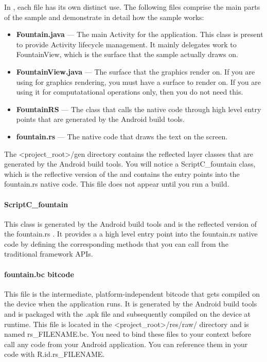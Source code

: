 In \Fountain{}, each file has its own distinct use. The following files comprise the main parts of the sample and demonstrate in detail how the sample works:
\begin{itemize}
\item \textbf{Fountain.java} ---  The main Activity for the application. This class is present to provide Activity lifecycle management. It mainly delegates work to FountainView, which is the \RS{} surface that the sample actually draws on.
\item \textbf{FountainView.java} --- The \RS{} surface that the graphics render on. If you are using \RS{} for graphics rendering, you must have a surface to render on. If you are using it for computatational operations only, then you do not need this.
\item \textbf{FountainRS} --- The class that calls the native \RS{} code through high level entry points that are generated by the Android build tools.
\item \textbf{fountain.rs} --- The \RS{} native code that draws the text on the screen.
\end{itemize}

The <project\_root>/gen directory contains the reflected layer classes that are generated by the Android build tools. You will notice a ScriptC\_fountain class, which is the reflective version of the \RS{} and contains the entry points into the fountain.rs native code. This file does not appear until you run a build.

\paragraph{ScriptC\_fountain}
This class is generated by the Android build tools and is the reflected version of the fountain.rs \RS{}. It provides a a high level entry point into the fountain.rs native code by defining the corresponding methods that you can call from the traditional framework APIs.

\paragraph{fountain.bc bitcode}
This file is the intermediate, platform-independent bitcode that gets compiled on the device when the \RS{} application runs. It is generated by the Android build tools and is packaged with the .apk file and subsequently compiled on the device at runtime. This file is located in the <project\_root>/res/raw/ directory and is named rs\_FILENAME.bc. You need to bind these files to your \RS{} context before call any \RS{} code from your Android application. You can reference them in your code with R.id.rs\_FILENAME.


